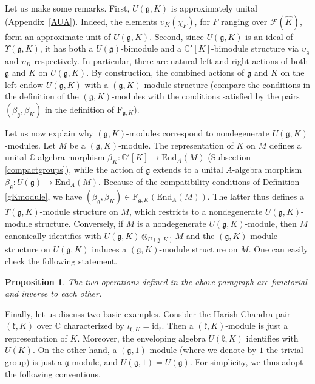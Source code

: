 \documentclass{amsart}
\newtheorem{proposition}[theorem]{Proposition}
\theoremstyle{definition}
\begin{document}
Let us make some remarks. First, $U(\mathfrak{g},K)$ is approximately unital (Appendix~\ref{AUA}). Indeed, the elements $\upsilon_K(\chi_F)$, for $F$ ranging over $\mathcal{F}(\widehat{K})$, form an approximate unit of $U(\mathfrak{g},K)$. Second, since $U(\mathfrak{g},K)$ is an ideal of $\Upsilon(\mathfrak{g},K)$, it has both a $U(\mathfrak{g})$-bimodule and a $\mathbb{C}'[K]$-bimodule structure via $\upsilon_\mathfrak{g}$ and $\upsilon_K$ respectively. In particular, there are natural left and right actions of both $\mathfrak{g}$ and $K$ on $U(\mathfrak{g},K)$. By construction, the combined actions of $\mathfrak{g}$ and $K$ on the left endow $U(\mathfrak{g},K)$ with a $(\mathfrak{g},K)$-module structure (compare the conditions in the definition of the $(\mathfrak{g},K)$-modules with the conditions satisfied by the pairs $(\beta_\mathfrak{g},\beta_K)$ in the definition of $\bm{\mathrm{F}}_{\mathfrak{g},K}$).

Let us now explain why $(\mathfrak{g},K)$-modules correspond to nondegenerate $U(\mathfrak{g},K)$-modules. Let $M$ be a $(\mathfrak{g},K)$-module. The representation of $K$ on $M$ defines a unital $\mathbb{C}$-algebra morphism $\beta_K : \mathbb{C}'[K] \to \mathrm{End}_A(M)$ (Subsection \ref{compactgroups}), while the action of $\mathfrak{g}$ extends to a unital $A$-algebra morphism $\beta_\mathfrak{g} : U(\mathfrak{g}) \to \mathrm{End}_A(M)$. Because of the compatibility conditions of Definition \ref{gKmodule}, we have $(\beta_\mathfrak{g},\beta_K) \in \bm{\mathrm{F}}_{\mathfrak{g},K}(\mathrm{End}_A(M))$. The latter thus defines a $\Upsilon(\mathfrak{g},K)$-module structure on $M$, which restricts to a nondegenerate $U(\mathfrak{g},K)$-module structure. Conversely, if $M$ is a nondegenerate $U(\mathfrak{g},K)$-module, then $M$ canonically identifies with $U(\mathfrak{g},K) \otimes_{U(\mathfrak{g},K)}M$ and the $(\mathfrak{g},K)$-module structure on $U(\mathfrak{g},K)$ induces a $(\mathfrak{g},K)$-module structure on $M$. One can easily check the following statement.

\begin{proposition}\label{correspondence_Umod_gKmod}
    The two operations defined in the above paragraph are functorial and inverse to each other.
\end{proposition}

Finally, let us discuss two basic examples. Consider the Harish-Chandra pair $(\mathfrak{k},K)$ over $\mathbb{C}$ characterized by $\iota_{\mathfrak{k},K} = \mathrm{id}_\mathfrak{k}$. Then a $(\mathfrak{k},K)$-module is just a representation of $K$. Moreover, the enveloping algebra $U(\mathfrak{k},K)$ identifies with $U(K)$. On the other hand, a $(\mathfrak{g},1)$-module (where we denote by $1$ the trivial group) is just a $\mathfrak{g}$-module, and $U(\mathfrak{g},1) = U(\mathfrak{g})$. For simplicity, we thus adopt the following conventions.
\end{document}
